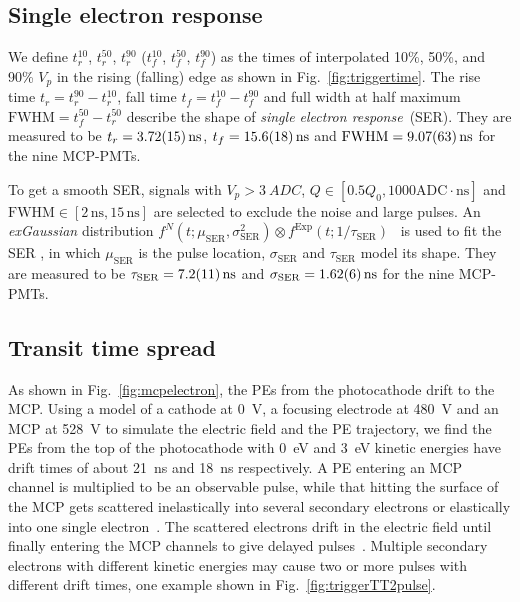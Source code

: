 \subsection{Single electron response}
\label{sec:SER}
We define $t^{10}_r$, $t^{50}_r$, $t^{90}_r$ ($t^{10}_f$, $t^{50}_f$, $t^{90}_f$) as the times of interpolated 10\%, 50\%, and 90\% $V_p$ in the rising (falling) edge as shown in Fig.~\ref{fig:triggertime}.  The rise time $t_r = t^{90}_r - t^{10}_r$, fall time $t_f = t^{10}_f - t^{90}_f$ and full width at half maximum $\mathrm{FWHM} = t^{50}_f - t^{50}_r$ describe the shape of \emph{single electron response}~(SER).  They are measured to be $t_r = \SI{3.72\pm0.15}{ns}$, $t_f = \SI{15.6\pm1.8}{ns}$ and $\mathrm{FWHM} = \SI{9.07\pm0.63}{ns}$ for the nine MCP-PMTs.

To get a smooth SER, signals with $V_p>\SI{3}{ADC}$, $Q \in [0.5Q_0, 1000\mathrm{ADC\cdot ns}]$ and $\mathrm{FWHM} \in [2\,\mathrm{ns}, 15\,\mathrm{ns}]$ are selected to exclude the noise and large pulses. %
An \emph{exGaussian} distribution $f^N(t;\mu_{\mathrm{SER}},\sigma_\mathrm{SER}^2)\otimes f^{\mathrm{Exp}}(t;1/\tau_\mathrm{SER})$~\cite{Luo:2022xrd} is used to fit the SER%
, in which $\mu_{\mathrm{SER}}$ is the pulse location, $\sigma_{\mathrm{SER}}$ and $\tau_{\mathrm{SER}}$ model its shape. They are measured to be $\tau_{\mathrm{SER}} = \SI{7.2\pm1.1}{ns}$ and $\sigma_{\mathrm{SER}} = \SI{1.62\pm0.06}{ns}$ for the nine MCP-PMTs.

\subsection{Transit time spread}
\label{sec:TTS}
As shown in Fig.~\ref{fig:mcpelectron}, the PEs from the photocathode drift to the MCP. Using a model of a cathode at \SI{0}{V}, a focusing electrode at \SI{480}{V} and an MCP at \SI{528}{V} to simulate the electric field and the PE trajectory, we find the PEs from the top of the photocathode with \SI{0}{eV} and \SI{3}{eV} kinetic energies have drift times of about \SI{21}{ns} and \SI{18}{ns} respectively. A PE entering an MCP channel is multiplied to be an observable pulse, while that hitting the surface of the MCP gets scattered inelastically into several secondary electrons or elastically into one single electron~\cite{Furman}. The scattered electrons drift in the electric field until finally entering the MCP channels to give delayed pulses~\cite{KM3NetTesting}. Multiple secondary electrons with different kinetic energies may cause two or more pulses with different drift times, one example shown in Fig.~\ref{fig:triggerTT2pulse}.

